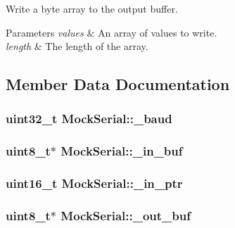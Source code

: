 Write a byte array to the output buffer. 


\begin{DoxyParams}{Parameters}
{\em values} & An array of values to write. \\
\hline
{\em length} & The length of the array. \\
\hline
\end{DoxyParams}


\subsection{Member Data Documentation}
\hypertarget{class_mock_serial_abbb8ad8b05cf475e6e34ba591a753146}{
\subsubsection[{\-\_\-baud}]{\setlength{\rightskip}{0pt plus 5cm}uint32\-\_\-t Mock\-Serial\-::\-\_\-baud}}\label{class_mock_serial_abbb8ad8b05cf475e6e34ba591a753146}
\hypertarget{class_mock_serial_a5516617e3418d21180c2f2c0cb3dbd15}{
\subsubsection[{\-\_\-in\-\_\-buf}]{\setlength{\rightskip}{0pt plus 5cm}uint8\-\_\-t$\ast$ Mock\-Serial\-::\-\_\-in\-\_\-buf}}\label{class_mock_serial_a5516617e3418d21180c2f2c0cb3dbd15}
\hypertarget{class_mock_serial_a4c3f74b6cef52501833158c064395b0a}{
\subsubsection[{\-\_\-in\-\_\-ptr}]{\setlength{\rightskip}{0pt plus 5cm}uint16\-\_\-t Mock\-Serial\-::\-\_\-in\-\_\-ptr}}\label{class_mock_serial_a4c3f74b6cef52501833158c064395b0a}
\hypertarget{class_mock_serial_af89e1c5936fd7d382175ae57a5c34bf6}{
\subsubsection[{\-\_\-out\-\_\-buf}]{\setlength{\rightskip}{0pt plus 5cm}uint8\-\_\-t$\ast$ Mock\-Serial\-::\-\_\-out\-\_\-buf}}\label{class_mock_serial_af89e1c5936fd7d382175ae57a5c34bf6}
